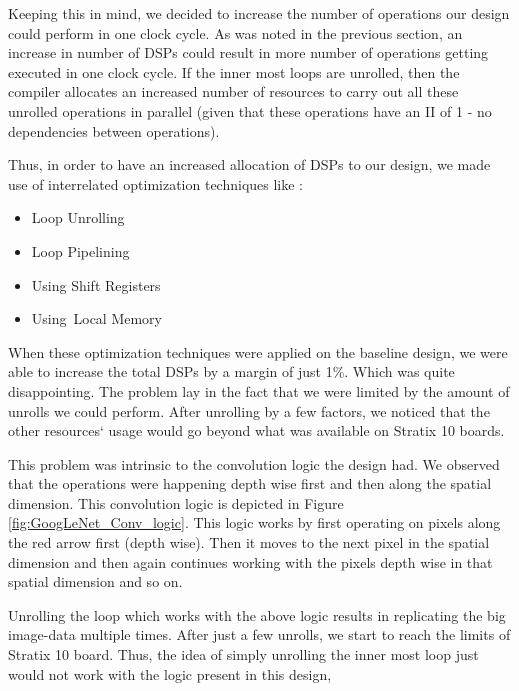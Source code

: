 Keeping this in mind, we decided to increase the number of operations our design could perform in one clock cycle. As was noted in the previous section, an increase in number of DSPs could result in more number of operations getting executed in one clock cycle. If the inner most loops are unrolled, then the compiler allocates an increased number of resources to carry out all these unrolled operations in parallel (given that these operations have an II of 1 - no dependencies between operations). 
 
 Thus, in order to have an increased allocation of DSPs to our design, we made use of interrelated  optimization techniques like : 
 \begin{itemize}
     \item Loop Unrolling
     \item Loop Pipelining
     \item Using Shift Registers
     \item Using Local Memory
\end{itemize}

When these optimization techniques were applied on the baseline design, we were able to increase the total DSPs by a margin of just 1\%. Which was quite disappointing. The problem lay in the fact that we were limited by the amount of unrolls we could perform. After unrolling by a few factors, we noticed that the other resources` usage would go beyond what was available on Stratix 10 boards.  

This problem was intrinsic to the convolution logic the design had. We observed that the operations were happening depth wise first and then along the spatial dimension. This convolution logic is depicted in Figure \ref{fig:GoogLeNet_Conv_logic}. This logic works by first operating on pixels along the red arrow first (depth wise). Then it moves to the next pixel in the spatial dimension and then again continues working with the pixels depth wise in that spatial dimension and so on.

Unrolling the loop which works with the above logic results in replicating the big image-data multiple times. After just a few unrolls, we start to reach the limits of Stratix 10 board. Thus, the idea of simply unrolling the inner most loop just would not work with the logic present in this design,

